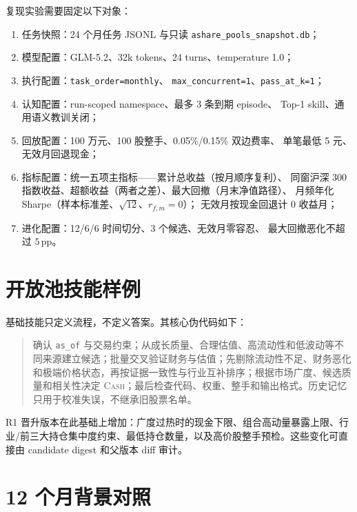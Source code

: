 \documentclass[11pt]{article}
\newcommand{\cash}{\textsc{Cash}}
\newcommand{\pp}{\,\mathrm{pp}}
\begin{document}
复现实验需要固定以下对象：
\begin{enumerate}
    \item 任务快照：24 个月任务 JSONL 与只读
    \texttt{ashare\_pools\_snapshot.db}；
    \item 模型配置：GLM-5.2、32k tokens、24 turns、temperature 1.0；
    \item 执行配置：\texttt{task\_order=monthly}、
    \texttt{max\_concurrent=1}、\texttt{pass\_at\_k=1}；
    \item 认知配置：run-scoped namespace、最多 3 条到期 episode、
    Top-1 skill、通用语义教训关闭；
    \item 回放配置：100 万元、100 股整手、0.05\%/0.15\% 双边费率、
    单笔最低 5 元、无效月回退现金；
    \item 指标配置：统一五项主指标——累计总收益（按月顺序复利）、
    同窗沪深 300 指数收益、超额收益（两者之差）、最大回撤（月末净值路径）、
    月频年化 Sharpe（样本标准差、$\sqrt{12}$、$r_{f,m}=0$）；
    无效月按现金回退计 0 收益月；
    \item 进化配置：12/6/6 时间切分、3 个候选、无效月零容忍、
    最大回撤恶化不超过 $5\pp$。
\end{enumerate}

\section{开放池技能样例}
\label{sec:appendix-skill}

基础技能只定义流程，不定义答案。其核心伪代码如下：
\begin{quote}
\small
确认 \texttt{as\_of} 与交易约束；从成长质量、合理估值、高流动性和低波动等不同来源建立候选；批量交叉验证财务与估值；先剔除流动性不足、财务恶化和极端价格状态，再按证据一致性与行业互补排序；根据市场广度、候选质量和相关性决定 \cash{}；最后检查代码、权重、整手和输出格式。历史记忆只用于校准失误，不继承旧股票名单。
\end{quote}

R1 晋升版本在此基础上增加：广度过热时的现金下限、组合高动量暴露上限、行业/前三大持仓集中度约束、最低持仓数量，以及高价股整手预检。这些变化可直接由 candidate digest 和父版本 diff 审计。

\section{12 个月背景对照}
\label{sec:appendix-phase1}
\end{document}
